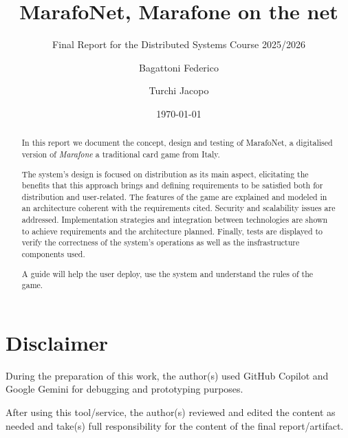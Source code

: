 \documentclass{scrartcl}
\title{\LARGE
  MarafoNet, Marafone on the net
}
\subtitle{Final Report for the Distributed Systems Course 2025/2026}
\author{
    Bagattoni Federico \\ \small{\emailaddr{federico.bagattoni@studio.unibo.it}}
    \and
    Turchi Jacopo \\ \small{\emailaddr{jacopo.turchi@studio.unibo.it}}
}
\date{\today}
\begin{document}
\maketitle

\begin{abstract}
  In this report we document the concept, design and testing of MarafoNet, a digitalised version of
  \textit{Marafone} a traditional card game from Italy.

  The system's design is focused on distribution as its main aspect, elicitating the benefits
  that this approach brings and defining requirements to be satisfied both for distribution and
  user-related.
  The features of the game are explained and modeled in an architecture coherent with the requirements
  cited. Security and scalability issues are addressed.
  Implementation strategies and integration between technologies are shown to achieve requirements
  and the architecture planned.
  Finally, tests are displayed to verify the correctness of the system's operations as well as the
  insfrastructure components used.

  A guide will help the user deploy, use the system and understand the rules of the game.
\end{abstract}

\section*{Disclaimer}

During the preparation of this work, the author(s) used GitHub Copilot and Google Gemini for debugging and prototyping purposes.

After using this tool/service, 
the author(s) reviewed and edited the content as needed 
and take(s) full responsibility for the content of the final report/artifact.
\end{document}
